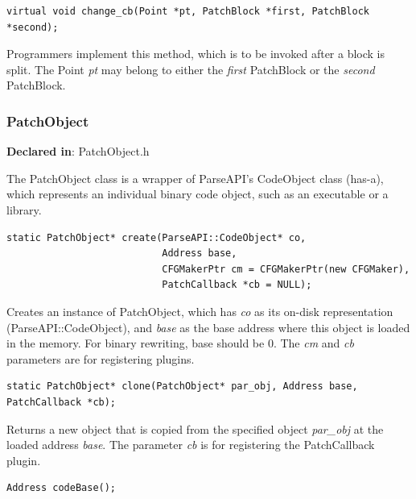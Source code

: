 \documentclass[11pt]{article}
\begin{document}
\begin{verbatim}
virtual void change_cb(Point *pt, PatchBlock *first, PatchBlock *second);

\end{verbatim}



Programmers implement this method, which is to be invoked after a block is
split. The Point \emph{pt} may belong to either the \emph{first} PatchBlock or the
\emph{second} PatchBlock.

\subsubsection{PatchObject}
\label{sec-3.2.8}

\textbf{Declared in}: PatchObject.h

The PatchObject class is a wrapper of ParseAPI's CodeObject class (has-a), which
represents an individual binary code object, such as an executable or a library.


\begin{verbatim}
static PatchObject* create(ParseAPI::CodeObject* co,
                           Address base,
                           CFGMakerPtr cm = CFGMakerPtr(new CFGMaker),
                           PatchCallback *cb = NULL);

\end{verbatim}



Creates an instance of PatchObject, which has \emph{co} as its on-disk representation
(ParseAPI::CodeObject), and \emph{base} as the base address where this object is
loaded in the memory. For binary rewriting, base should be 0. The \emph{cm} and \emph{cb}
parameters are for registering plugins.


\begin{verbatim}
static PatchObject* clone(PatchObject* par_obj, Address base, PatchCallback *cb);

\end{verbatim}



Returns a new object that is copied from the specified object \emph{par\_obj} at the
loaded address \emph{base}. The parameter \emph{cb} is for registering the PatchCallback
plugin.


\begin{verbatim}
Address codeBase();

\end{verbatim}
\end{document}
